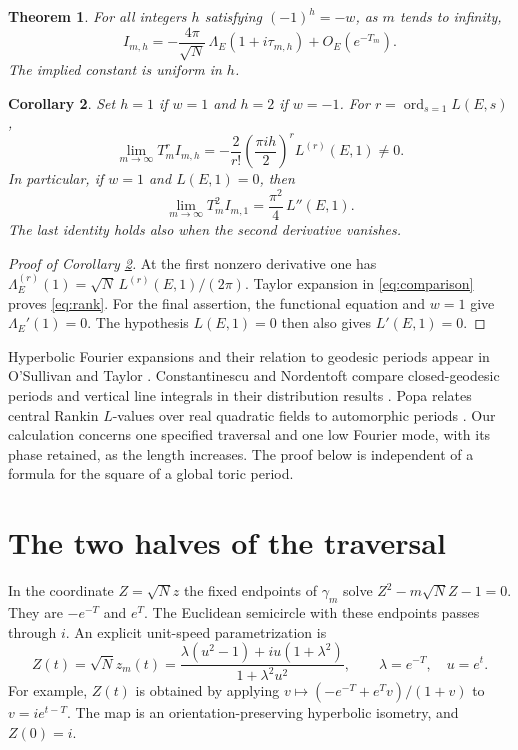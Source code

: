 \documentclass[11pt]{article}
\newtheorem{theorem}{Theorem}[section]
\newtheorem{corollary}[theorem]{Corollary}
\DeclareMathOperator{\ord}{ord}
\begin{document}
\begin{theorem}\label{thm:comparison}
For all integers \(h\) satisfying \((-1)^h=-w\), as \(m\) tends to infinity,
\begin{equation}
 I_{m,h}=-\frac{4\pi}{\sqrt N}\,
         \Lambda_E(1+i\tau_{m,h})+O_E(e^{-T_m}).
 \label{eq:comparison}
\end{equation}
The implied constant is uniform in \(h\).
\end{theorem}

\begin{corollary}\label{cor:rank}
Set \(h=1\) if \(w=1\) and \(h=2\) if \(w=-1\).
For \(r=\ord_{s=1}L(E,s)\),
\begin{equation}
 \lim_{m\to\infty} T_m^r I_{m,h}
 =-\frac{2}{r!}\left(\frac{\pi i h}{2}\right)^r L^{(r)}(E,1)\ne0 .
 \label{eq:rank}
\end{equation}
In particular, if \(w=1\) and \(L(E,1)=0\), then
\[
 \lim_{m\to\infty} T_m^2 I_{m,1}
   =\frac{\pi^2}{4}\,L''(E,1).
\]
The last identity holds also when the second derivative vanishes.
\end{corollary}

\begin{proof}[Proof of Corollary \ref{cor:rank}]
At the first nonzero derivative one has
\(\Lambda_E^{(r)}(1)=\sqrt N\,L^{(r)}(E,1)/(2\pi)\).
Taylor expansion in \eqref{eq:comparison} proves \eqref{eq:rank}. For the
final assertion, the functional equation and \(w=1\) give
\(\Lambda_E'(1)=0\). The hypothesis \(L(E,1)=0\) then also gives
\(L'(E,1)=0\).
\end{proof}

Hyperbolic Fourier expansions and their relation to geodesic periods appear
in O'Sullivan and Taylor \cite{ost}. Constantinescu and Nordentoft compare
closed-geodesic periods and vertical line integrals in their distribution
results \cite{cn}. Popa relates central Rankin \(L\)-values over real
quadratic fields to automorphic periods \cite{popa}. Our calculation concerns
one specified traversal and one low Fourier mode, with its phase retained,
as the length increases. The proof below is independent of a formula for
the square of a global toric period.

\section{The two halves of the traversal}

In the coordinate \(Z=\sqrt N z\) the fixed endpoints of \(\gamma_m\) solve
\(Z^2-m\sqrt N Z-1=0\). They are \(-e^{-T}\) and \(e^T\). The Euclidean
semicircle with these endpoints passes through \(i\). An explicit unit-speed
parametrization is
\begin{equation}
 Z(t)=\sqrt N z_m(t)=
 \frac{\lambda(u^2-1)+i u(1+\lambda^2)}{1+\lambda^2 u^2},
 \qquad \lambda=e^{-T},\quad u=e^t.
 \label{eq:param}
\end{equation}
For example, \(Z(t)\) is obtained by applying
\(v\mapsto(-e^{-T}+e^T v)/(1+v)\) to \(v=i e^{t-T}\).
The map is an orientation-preserving hyperbolic isometry, and \(Z(0)=i\).
\end{document}
